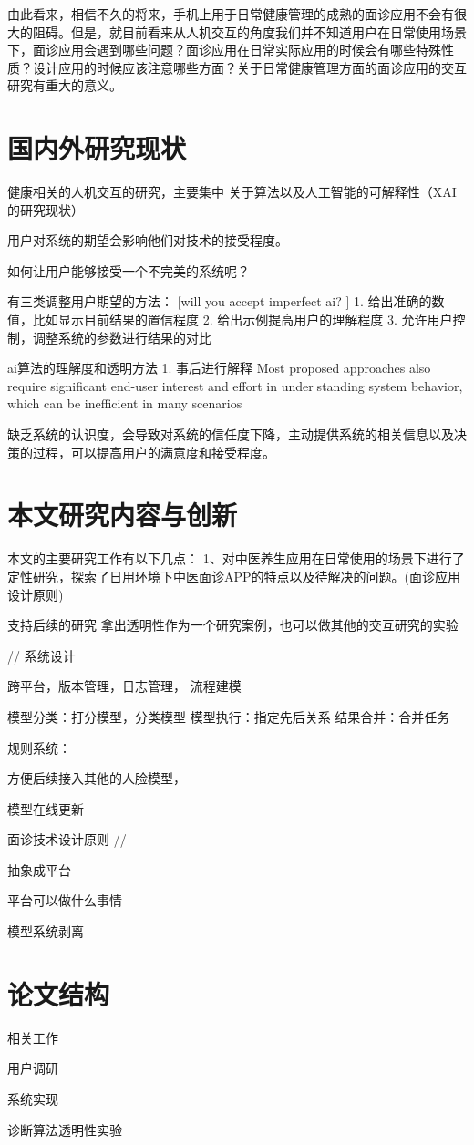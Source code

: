 由此看来，相信不久的将来，手机上用于日常健康管理的成熟的面诊应用不会有很大的阻碍。但是，就目前看来从人机交互的角度我们并不知道用户在日常使用场景下，面诊应用会遇到哪些问题？面诊应用在日常实际应用的时候会有哪些特殊性质？设计应用的时候应该注意哪些方面？关于日常健康管理方面的面诊应用的交互研究有重大的意义。

\section{国内外研究现状}
健康相关的人机交互的研究，主要集中
关于算法以及人工智能的可解释性（XAI的研究现状）


用户对系统的期望会影响他们对技术的接受程度。

如何让用户能够接受一个不完美的系统呢？

有三类调整用户期望的方法： [will you accept imperfect ai? ]
1. 给出准确的数值，比如显示目前结果的置信程度
2. 给出示例提高用户的理解程度
3. 允许用户控制，调整系统的参数进行结果的对比


ai算法的理解度和透明方法
1. 事后进行解释  Most proposed approaches
also require significant end-user interest and effort in understanding system behavior, which can be inefficient in many
scenarios

缺乏系统的认识度，会导致对系统的信任度下降，主动提供系统的相关信息以及决策的过程，可以提高用户的满意度和接受程度。

\section{本文研究内容与创新}

本文的主要研究工作有以下几点：
1、对中医养生应用在日常使用的场景下进行了定性研究，探索了日用环境下中医面诊APP的特点以及待解决的问题。(面诊应用设计原则)




支持后续的研究
拿出透明性作为一个研究案例，也可以做其他的交互研究的实验

// 系统设计

跨平台，版本管理，日志管理， 流程建模

模型分类：打分模型，分类模型
模型执行：指定先后关系
结果合并：合并任务

规则系统：

方便后续接入其他的人脸模型，

模型在线更新

面诊技术设计原则 // 

抽象成平台

平台可以做什么事情

模型系统剥离  

\section{论文结构}

相关工作

用户调研

系统实现

诊断算法透明性实验